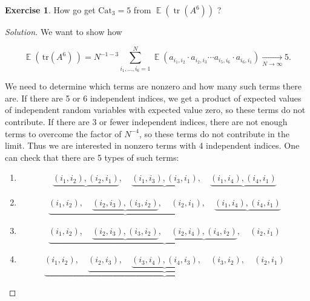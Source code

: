 \documentclass[letterpaper,11pt,oneside,reqno]{amsart}
\numberwithin{equation}{section}
\DeclareMathOperator{\EE}{\mathbb{E}}
\theoremstyle{definition}
\newtheorem{exercise}[proposition]{Exercise}
\begin{document}
\begin{exercise}
How go get $ \mathrm{Cat}_3 = 5 $ from $ \EE(\mathop{\mathrm{tr}}( A^6 ) )$ ?
\end{exercise}
\begin{proof}[Solution]
	We want to show how

	\begin{equation*}
	\EE( \, \text{tr}( A^6 ) \, ) = N^{ -1 - 3 } \sum_{ i_1 , \ldots, i_6 = 1 }^N \EE \left( a_{ i_1, i_2 } \cdot a_{ i_2, i_3 } \cdots a_{ i_5, i_6 } \cdot a_{ i_6, i_1 } \right) \xrightarrow[ N \to \infty ]{} 5.
	\end{equation*}

	We need to determine which terms are nonzero and how many such terms there are.  If there are 5 or 6 independent indices, we get a product of expected values of independent random variables with expected value zero, so these terms do not contribute.  If there are 3 or fewer independent indices, there are not enough terms to overcome the factor of $ N^{ -4 } $, so these terms do not contribute in the limit.  Thus we are interested in nonzero terms with 4 independent indices.
	One can check that there are 5 types of such terms:

	\begin{enumerate}

	\item
	\begin{equation*}
	\underbrace{ ( i_1, i_2 ) , ( i_2 , i_1 ) }, \quad \underbrace{ ( i_1, i_3 ) , ( i_3, i_1 ) }, \quad \underbrace{ ( i_1, i_4 ), ( i_4, i_1 ) }
	\end{equation*}

	\item
	\begin{equation*}
	\underbrace{ ( i_1, i_2 ) , \quad \underbrace{ ( i_2 , i_3 ) , ( i_3, i_2 ) } , \quad ( i_2, i_1 ) } , \quad \underbrace{ ( i_1, i_4 ), ( i_4, i_1 ) }
	\end{equation*}

	\item
	\begin{equation*}
	\underbrace{ ( i_1, i_2 ) , \quad \underbrace{ ( i_2 , i_3 ) , ( i_3, i_2 ) } , \quad \underbrace{ ( i_2, i_4 ) , ( i_4, i_2 ) }, \quad ( i_2, i_1 ) } 
	\end{equation*}

	\item
	\begin{equation*}
	\underbrace{ ( i_1, i_2 ) , \quad \underbrace{ ( i_2 , i_3 ) , \quad \underbrace{ ( i_3, i_4 ) , ( i_4, i_3 ) }, \quad ( i_3, i_2 ) } , \quad ( i_2, i_1 ) } 
	\end{equation*}


\end{enumerate}
\end{proof}
\end{document}
